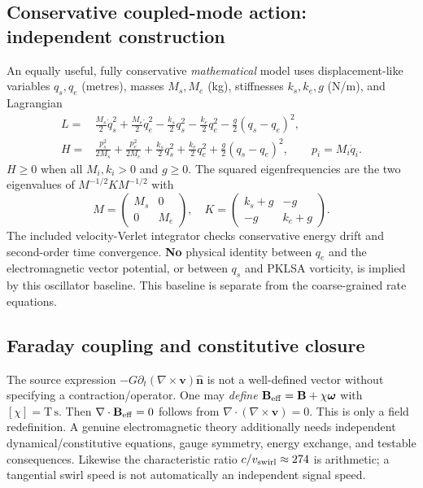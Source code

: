 \documentclass[10pt,a4paper]{article}
\newcommand{\om}{\boldsymbol{\omega}}
\newcommand{\vfield}{\mathbf v}
\begin{document}
\subsection{Conservative coupled-mode action: independent construction}
An equally useful, fully conservative \emph{mathematical} model uses displacement-like variables $q_s,q_e$ (metres), masses $M_s,M_e$ (kg), stiffnesses $k_s,k_e,g$ (N/m), and Lagrangian
\begin{align}
L=&\frac{M_s}{2}\dot q_s^2+\frac{M_e}{2}\dot q_e^2-\frac{k_s}{2}q_s^2
 -\frac{k_e}{2}q_e^2-\frac{g}{2}(q_s-q_e)^2,\\
H=&\frac{p_s^2}{2M_s}+\frac{p_e^2}{2M_e}+\frac{k_s}{2}q_s^2+
\frac{k_e}{2}q_e^2+\frac{g}{2}(q_s-q_e)^2,\qquad p_i=M_i\dot q_i.
\end{align}
$H\ge0$ when all $M_i,k_i>0$ and $g\ge0$. The squared eigenfrequencies are the two eigenvalues of $M^{-1/2}KM^{-1/2}$ with
\[
M=\begin{pmatrix}M_s&0\\0&M_e\end{pmatrix},\quad
K=\begin{pmatrix}k_s+g&-g\\-g&k_e+g\end{pmatrix}.
\]
The included velocity-Verlet integrator checks conservative energy drift and second-order time convergence. \textbf{No} physical identity between $q_e$ and the electromagnetic vector potential, or between $q_s$ and PKLSA vorticity, is implied by this oscillator baseline. This baseline is separate from the coarse-grained rate equations.

\subsection{Faraday coupling and constitutive closure}
The source expression $-G\partial_t(\nabla\times\vfield)\hat{\mathbf n}$ is not a well-defined vector without specifying a contraction/operator. One may \emph{define} $\mathbf B_{\rm eff}=\mathbf B+\chi\om$ with $[\chi]=\mathrm{T\,s}$. Then $\nabla\cdot\mathbf B_{\rm eff}=0$ follows from $\nabla\cdot(\nabla\times\vfield)=0$. This is only a field redefinition. A genuine electromagnetic theory additionally needs independent dynamical/constitutive equations, gauge symmetry, energy exchange, and testable consequences. Likewise the characteristic ratio $c/v_{\rm swirl}\approx274$ is arithmetic; a tangential swirl speed is not automatically an independent signal speed.
\end{document}
